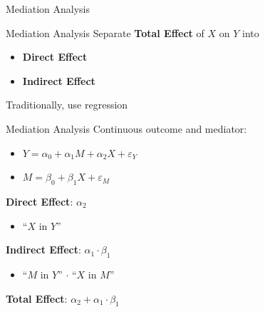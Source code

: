 \documentclass[14pt]{beamer}
\begin{document}
\begin{frame}{Mediation Analysis}
    \begin{figure}[H]
    \end{figure}
\end{frame}

\begin{frame}{Mediation Analysis}
    Separate \textbf{Total Effect} of $X$ on $Y$ into
    \begin{itemize}
        \item \textbf{Direct Effect}
        \item \textbf{Indirect Effect}\newline
    \end{itemize}

    Traditionally, use regression
\end{frame}

\begin{frame}{Mediation Analysis}
    Continuous outcome and mediator:
    \begin{itemize}
        \item $Y = \alpha_0 + \alpha_1 M + \alpha_2 X + \varepsilon_Y$
        \item $M = \beta_0 + \beta_1 X + \varepsilon_M$ \newline
    \end{itemize}

    
    \textbf{Direct Effect}: $\alpha_2$
    \begin{itemize}
        \item ``$X$ in $Y$''
    \end{itemize}
    \textbf{Indirect Effect}: $\alpha_1 \cdot \beta_1$
    \begin{itemize}
        \item ``$M$ in $Y$'' $\cdot$ ``$X$ in $M$''
    \end{itemize}
    \textbf{Total Effect}: $\alpha_2 + \alpha_1 \cdot \beta_1$

\end{frame}
\end{document}
